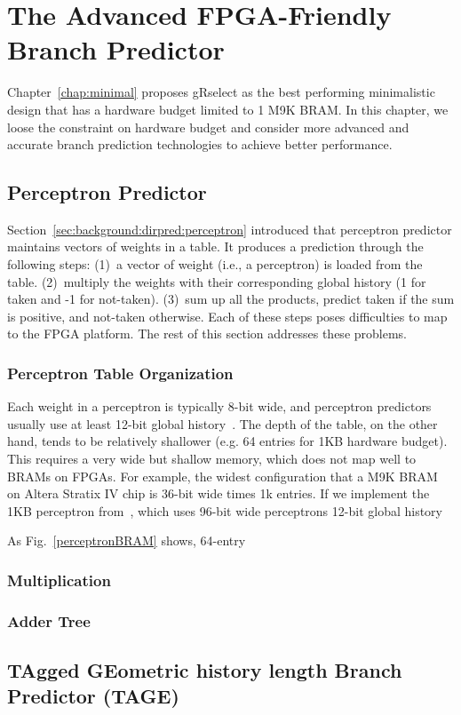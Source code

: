 \chapter{The Advanced FPGA-Friendly Branch Predictor}
\label{chap:advanced}

Chapter~\ref{chap:minimal} proposes gRselect as the best performing minimalistic design that has a hardware budget limited to 1 M9K BRAM. In this chapter, we loose the constraint on hardware budget and consider more advanced and accurate branch prediction technologies to achieve better performance.

\section{Perceptron Predictor}
\label{sec:advanced:perceptron}
Section~\ref{sec:background:dirpred:perceptron} introduced that perceptron predictor maintains vectors of weights in a table. It produces a prediction through the following steps: (1)~a vector of weight (i.e., a perceptron) is loaded from the table. (2)~multiply the weights with their corresponding global history (1 for taken and -1 for not-taken). (3)~sum up all the products, predict taken if the sum is positive, and not-taken otherwise. Each of these steps poses difficulties to map to the FPGA platform. The rest of this section addresses these problems.

\subsection{Perceptron Table Organization}
\label{sec:advanced:perceptron:table}
Each weight in a perceptron is typically 8-bit wide, and perceptron predictors usually use at least 12-bit global history~\cite{perceptron}. The depth of the table, on the other hand, tends to be relatively shallower (e.g. 64 entries for 1KB hardware budget). This requires a very wide but shallow memory, which does not map well to BRAMs on FPGAs. For example, the widest configuration that a M9K BRAM on Altera Stratix IV chip is 36-bit wide times 1k entries. If we implement the 1KB perceptron from~\cite{perceptron}, which uses 96-bit wide perceptrons 12-bit global history

As Fig.~\ref{perceptronBRAM} shows,
64-entry




\subsection{Multiplication}
\label{sec:advanced:perceptron:mult}



\subsection{Adder Tree}
\label{sec:advanced:perceptron:adder}











\section{TAgged GEometric history length Branch Predictor (TAGE)}
\label{sec:advanced:tage}






